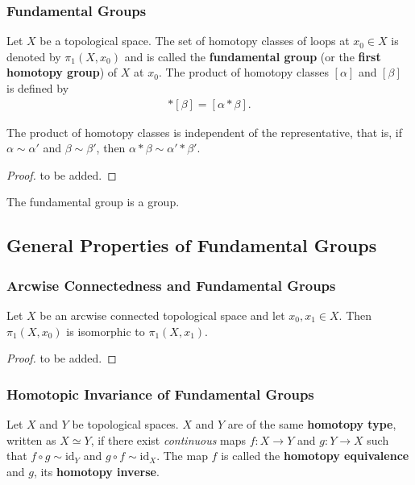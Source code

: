 \documentclass[10pt]{article}
\begin{document}
\subsubsection{Fundamental Groups}
\begin{definition}
    Let $X$ be a topological space.
    The set of homotopy classes of loops at $x_0\in X$ is denoted by $\pi_1(X,x_0)$ and is called the \textbf{fundamental group} (or the \textbf{first homotopy group}) of $X$ at $x_0$.
    The product of homotopy classes $[\alpha]$ and $[\beta]$ is defined by
    \begin{align}
        [\alpha]* [\beta]=[\alpha*\beta].
    \end{align}
\end{definition}

\begin{lemma}
    The product of homotopy classes is independent of the representative, that is, if $\alpha\sim\alpha'$ and $\beta\sim\beta'$, then $\alpha*\beta\sim\alpha'*\beta'$.
\end{lemma}
\begin{proof}
    to be added.
\end{proof}

\begin{theorem}
    The fundamental group is a group.
\end{theorem}


\subsection{General Properties of Fundamental Groups}
\subsubsection{Arcwise Connectedness and Fundamental Groups}
\begin{theorem}
    Let $X$ be an arcwise connected topological space and let $x_0,x_1\in X$.
    Then $\pi_1(X,x_0)$ is isomorphic to $\pi_1(X,x_1)$.
\end{theorem}
\begin{proof}
    to be added.
\end{proof}

\subsubsection{Homotopic Invariance of Fundamental Groups}

\begin{definition}
    Let $X$ and $Y$ be topological spaces.
    $X$ and $Y$ are of the same \textbf{homotopy type}, written as $X\simeq Y$, if there exist \textit{continuous} maps $f:X\to Y$ and $g:Y\to X$ such that $f\circ g\sim\text{id}_Y$ and $g\circ f\sim\text{id}_X$.
    The map $f$ is called the \textbf{homotopy equivalence} and $g$, its \textbf{homotopy inverse}.
\end{definition}
\end{document}

